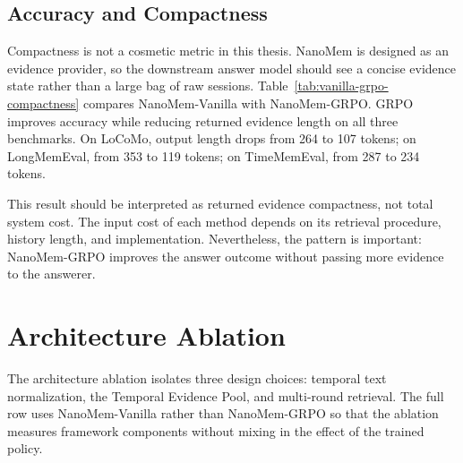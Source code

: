 \subsection{Accuracy and Compactness}
\label{subsec:analysis-compactness}

Compactness is not a cosmetic metric in this thesis. NanoMem is designed as an
evidence provider, so the downstream answer model should see a concise evidence
state rather than a large bag of raw sessions. Table~\ref{tab:vanilla-grpo-compactness}
compares NanoMem-Vanilla with NanoMem-GRPO. GRPO improves accuracy while
reducing returned evidence length on all three benchmarks. On LoCoMo, output
length drops from 264 to 107 tokens; on LongMemEval, from 353 to 119 tokens; on
TimeMemEval, from 287 to 234 tokens.

\begin{table}[H]
  \centering
  \caption{NanoMem-Vanilla versus NanoMem-GRPO accuracy and returned evidence
  compactness.}
  \label{tab:vanilla-grpo-compactness}
  \scriptsize
\end{table}

This result should be interpreted as returned evidence compactness, not total
system cost. The input cost of each method depends on its retrieval procedure,
history length, and implementation. Nevertheless, the pattern is important:
NanoMem-GRPO improves the answer outcome without passing more evidence to the
answerer.

\section{Architecture Ablation}
\label{sec:architecture-ablation-results}
\label{sec:results-architecture}

The architecture ablation isolates three design choices: temporal text
normalization, the Temporal Evidence Pool, and multi-round retrieval. The full
row uses NanoMem-Vanilla rather than NanoMem-GRPO so that the ablation measures
framework components without mixing in the effect of the trained policy.

